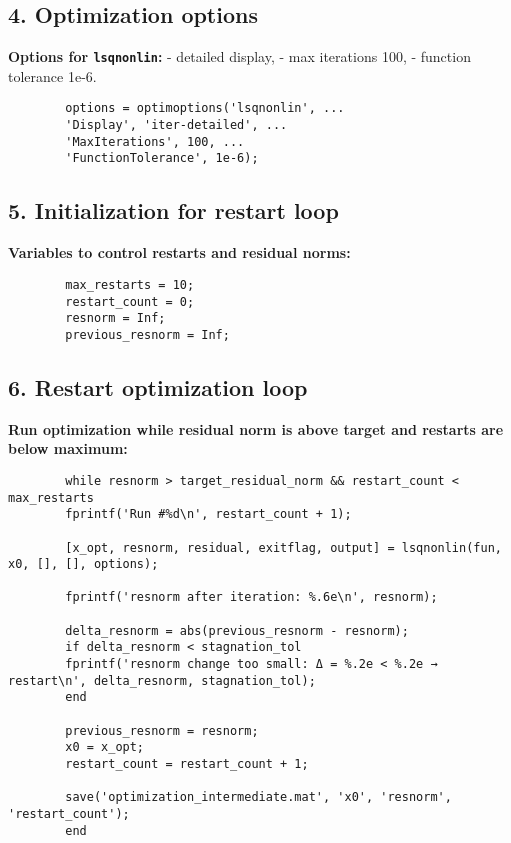 \documentclass{article}
\begin{document}
	\subsection*{4. Optimization options}
	
	\textbf{Options for \texttt{lsqnonlin}:}  
	- detailed display,  
	- max iterations 100,  
	- function tolerance 1e-6.
	
	\begin{lstlisting}
		options = optimoptions('lsqnonlin', ...
		'Display', 'iter-detailed', ...
		'MaxIterations', 100, ...
		'FunctionTolerance', 1e-6);
	\end{lstlisting}
	
	\subsection*{5. Initialization for restart loop}
	
	\textbf{Variables to control restarts and residual norms:}
	
	\begin{lstlisting}
		max_restarts = 10;
		restart_count = 0;
		resnorm = Inf;
		previous_resnorm = Inf;
	\end{lstlisting}
	
	\subsection*{6. Restart optimization loop}
	
	\textbf{Run optimization while residual norm is above target and restarts are below maximum:}
	
	\begin{lstlisting}
		while resnorm > target_residual_norm && restart_count < max_restarts
		fprintf('Run #%d\n', restart_count + 1);
		
		[x_opt, resnorm, residual, exitflag, output] = lsqnonlin(fun, x0, [], [], options);
		
		fprintf('resnorm after iteration: %.6e\n', resnorm);
		
		delta_resnorm = abs(previous_resnorm - resnorm);
		if delta_resnorm < stagnation_tol
		fprintf('resnorm change too small: Δ = %.2e < %.2e → restart\n', delta_resnorm, stagnation_tol);
		end
		
		previous_resnorm = resnorm;
		x0 = x_opt;
		restart_count = restart_count + 1;
		
		save('optimization_intermediate.mat', 'x0', 'resnorm', 'restart_count');
		end
	\end{lstlisting}
	
\end{document}
